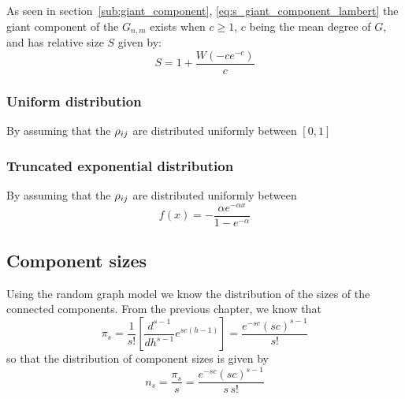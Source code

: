 As seen in section~\vref{sub:giant_component}, \vref{eq:s_giant_component_lambert} the giant component of the $G_{n,m}$ exists when $c \ge 1$, $c$ being the mean degree of $G$, and has relative size $S$ given by:
\begin{equation}
	S = 1 + \frac{W(-c e^{-c})}{c}
\end{equation}


\subsubsection{Uniform distribution} %
\label{ssub:uniform_distribution}

By assuming that the $\rho_{ij}$ are distributed uniformly between $[0,1]$


\subsubsection{Truncated exponential distribution} %
\label{ssub:truncated_exponential_distribution}

By assuming that the $\rho_{ij}$ are distributed uniformly between
\begin{equation}
	f(x) = - \frac{\alpha e^{- \alpha x}}{1-e^{-\alpha}}
\end{equation}





\subsection{Component sizes} %
\label{sub:component_sizes}

Using the random graph model we know the distribution of the sizes of the connected components.
From the previous chapter, we know that
\begin{equation}
	\pi_s = \frac{1}{s!}\left[  \frac{d^{s-1}}{dh^{s-1}}e^{s c(h-1)}  \right] = \frac{e^{-s c} (s c)^{s-1}}{s!}
\end{equation}
so that the distribution of component sizes is given by
\begin{equation}
	n_s = \frac{\pi_s}{s} = \frac{e^{-s c} (s c)^{s-1}}{s\,s!}
\end{equation}













